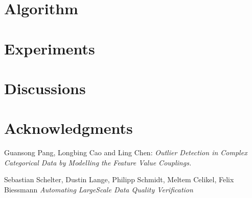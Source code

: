 \documentclass{article}
\begin{document}

\section{Algorithm} %
\label{sec:Algorithm}




\section{Experiments} %
\label{sec:Experiments}




\section{Discussions} %
\label{sec:Discussions}




\section*{Acknowledgments} %
\label{sec:Acknowledgments}




\begin{thebibliography}{999}

    Guansong Pang, Longbing Cao and Ling Chen:
    \emph{Outlier Detection in Complex Categorical Data
        by Modelling the Feature Value Couplings.}

    Sebastian Schelter, Dustin Lange, Philipp Schmidt, Meltem Celikel, Felix Biessmann
    \emph{Automating LargeScale Data Quality Verification}


\end{thebibliography}
\end{document}
